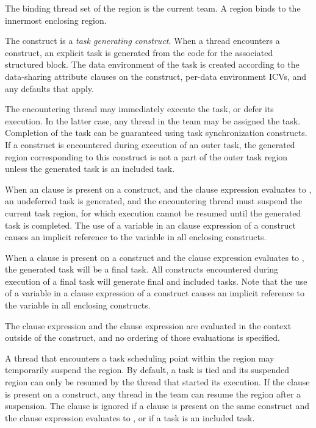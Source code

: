 \binding
The binding thread set of the  region is the current team. A  region binds to
the innermost enclosing  region.

\descr

The  construct is a \emph{task generating construct}. When a thread
encounters a  construct, an explicit task is generated from the code
for the associated structured block. The data environment of the task is
created according to the data-sharing attribute clauses on the 
construct, per-data environment ICVs, and any defaults that apply.

The encountering thread may immediately execute the task, or defer its execution. In the
latter case, any thread in the team may be assigned the task. Completion of the task can
be guaranteed using task synchronization constructs.
If a  construct is encountered during execution of an outer
task, the generated  region corresponding to this construct is not a
part of the outer task region unless the generated task is
an included task.

When an  clause is present on a  construct, and the  clause expression
evaluates to , an undeferred task is generated, and the encountering thread must
suspend the current task region, for which execution cannot be resumed until the
generated task is completed. The use of a variable in an  clause expression
of a  construct causes an implicit reference to the variable in all enclosing
constructs.

When a  clause is present on a  construct and the  clause expression
evaluates to , the generated task will be a final task. All  constructs
encountered during execution of a final task will generate final and included tasks. Note
that the use of a variable in a  clause expression of a  construct causes an
implicit reference to the variable in all enclosing constructs.

The  clause expression and the  clause expression are evaluated in the context
outside of the  construct, and no ordering of those evaluations is specified.

A thread that encounters a task scheduling point within the  region may
temporarily suspend the  region. By default, a task is tied and its suspended 
region can only be resumed by the thread that started its execution. If the 
clause is present on a  construct, any thread in the team can resume the 
region after a suspension. The  clause is ignored if a  clause is present
on the same  construct and the  clause expression evaluates to , or if a
task is an included task.

